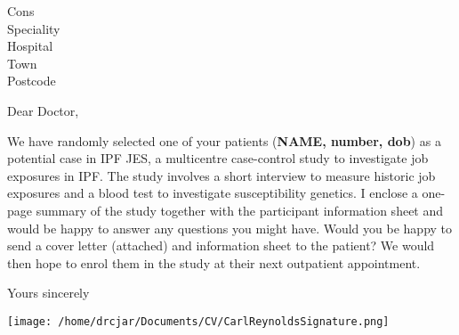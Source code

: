 \documentclass[ipfjes,letterpaper,pagesize,UScommercial9]{scrlttr2}
\begin{document}
\begin{letter}{Cons \\ Speciality \\ Hospital \\ Town \\ Postcode}


\opening{Dear Doctor,}

    We have randomly selected one of your patients (\textbf{NAME, number, dob}) as a potential case in IPF JES, a multicentre case-control study to investigate job exposures in IPF.
    The study involves a short interview to measure historic job exposures and a blood test to investigate susceptibility genetics. I enclose a one-page summary of the study together with the participant information sheet and would be happy to answer any questions you might have.
    Would you be happy to send a cover letter (attached) and information sheet to the patient? We would then hope to enrol them in the study at their next outpatient appointment.



\closing{Yours sincerely}

    \texttt{[image: /home/drcjar/Documents/CV/CarlReynoldsSignature.png]}

\end{letter}
\end{document}
